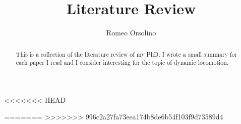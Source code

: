 \documentclass{article}
\begin{document}
\title{Literature Review}
\author{Romeo Orsolino}

\maketitle
\tableofcontents
\begin{abstract}
This is a collection of the literature review of my PhD. I wrote a small summary for each paper I read and I consider interesting for the topic of dynamic locomotion.
\end{abstract}




















<<<<<<< HEAD




=======
>>>>>>> 996c2a27fa73eea174b8de6b54f103f9d73589d4



\end{document}
